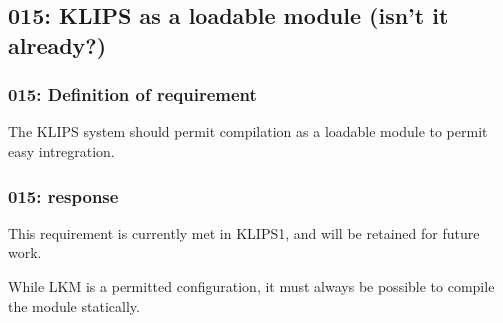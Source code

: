 \subsection{015: KLIPS as a loadable module (isn't it already?)}

\subsubsection{015: Definition of requirement }

The KLIPS system should permit compilation as a loadable module to permit easy
intregration.

\subsubsection{015: response}

This requirement is currently met in KLIPS1, and will be retained for future
work.

While LKM is a permitted configuration, it must always be possible to compile 
the module statically.


